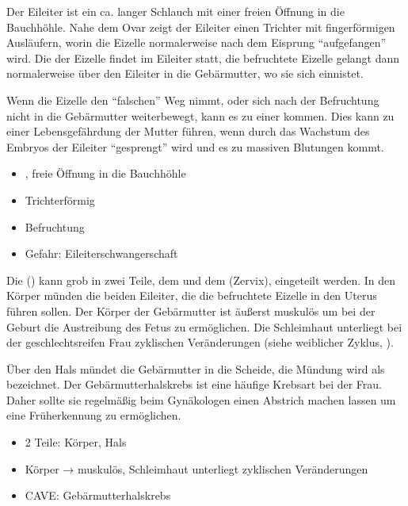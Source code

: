 {%
Der Eileiter  ist ein ca.
\CM* langer Schlauch mit einer freien Öffnung
in die Bauchhöhle. Nahe dem Ovar zeigt der Eileiter einen
Trichter mit fingerförmigen Ausläufern, worin die Eizelle
normalerweise nach dem Eisprung
\protect\enquote{aufgefangen} wird.
Die  der Eizelle findet im Eileiter statt,
die befruchtete Eizelle gelangt dann normalerweise über den
Eileiter in die Gebärmutter, wo sie sich einnistet.

Wenn die Eizelle den \protect\enquote{falschen} Weg nimmt,
oder sich nach der Befruchtung nicht in die Gebärmutter
weiterbewegt, kann es zu einer 
kommen. Dies kann zu einer Lebensgefährdung der Mutter
führen, wenn durch das Wachstum des Embryos der Eileiter
\protect\enquote{gesprengt} wird und es zu massiven
Blutungen kommt.
}
{
\begin{itemize}
  \item {}\CM*, freie Öffnung in die Bauchhöhle
  \item Trichterförmig
  \item Befruchtung
  \item Gefahr: Eileiterschwangerschaft
\end{itemize}
}{}{}{}


{%
Die  () kann grob in zwei Teile,
dem  und dem  (Zervix), eingeteilt werden.
In den Körper münden die beiden Eileiter, die die
befruchtete Eizelle in den Uterus führen sollen.
Der Körper der Gebärmutter ist äußerst muskulös um bei der
Geburt die Austreibung des Fetus zu ermöglichen.
Die Schleimhaut unterliegt bei der geschlechtsreifen Frau
zyklischen Veränderungen (siehe weiblicher Zyklus,
).

Über den Hals mündet die Gebärmutter in die Scheide, die
Mündung wird als  bezeichnet.
Der Gebärmutterhalskrebs  ist eine
häufige Krebsart bei der Frau. 
Daher sollte sie regelmäßig beim Gynäkologen einen Abstrich
machen lassen um eine Früherkennung zu ermöglichen.
}
{
\begin{itemize}
  \item 2 Teile: Körper, Hals
  \item Körper → muskulös, Schleimhaut unterliegt zyklischen Veränderungen
  \item CAVE: Gebärmutterhalskrebs
\end{itemize}
}{}{}{}



